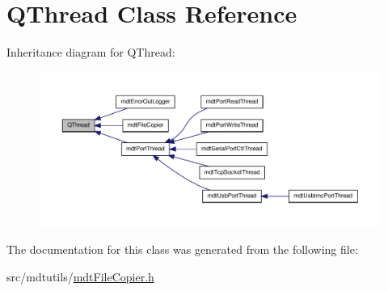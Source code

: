 \hypertarget{class_q_thread}{\section{Q\-Thread Class Reference}
\label{class_q_thread}
}


Inheritance diagram for Q\-Thread\-:\nopagebreak
\begin{figure}[H]
\begin{center}
\leavevmode
\includegraphics[width=350pt]{class_q_thread__inherit__graph}
\end{center}
\end{figure}


The documentation for this class was generated from the following file\-:\begin{DoxyCompactItemize}
\item 
src/mdtutils/\hyperlink{mdt_file_copier_8h}{mdt\-File\-Copier.\-h}\end{DoxyCompactItemize}
